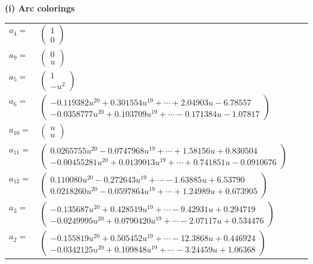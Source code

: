 \documentclass[1p]{elsarticle_modified}
\theoremstyle{definition}
\begin{document}
\flushleft \textbf{(i) Arc colorings}\\
\begin{tabular}{m{7pt} m{180pt} m{7pt} m{180pt} }
\flushright $a_{4}=$&$\begin{pmatrix}1\\0\end{pmatrix}$ \\
\flushright $a_{9}=$&$\begin{pmatrix}0\\u\end{pmatrix}$ \\
\flushright $a_{5}=$&$\begin{pmatrix}1\\- u^2\end{pmatrix}$ \\
\flushright $a_{6}=$&$\begin{pmatrix}-0.119382 u^{20}+0.301554 u^{19}+\cdots+2.04903 u-6.78557\\-0.0358777 u^{20}+0.103709 u^{19}+\cdots-0.171384 u-1.07817\end{pmatrix}$ \\
\flushright $a_{10}=$&$\begin{pmatrix}u\\u\end{pmatrix}$ \\
\flushright $a_{11}=$&$\begin{pmatrix}0.0265755 u^{20}-0.0747968 u^{19}+\cdots+1.58156 u+0.830504\\-0.00455281 u^{20}+0.0139013 u^{19}+\cdots+0.741851 u-0.0910676\end{pmatrix}$ \\
\flushright $a_{12}=$&$\begin{pmatrix}0.110080 u^{20}-0.272643 u^{19}+\cdots-1.63885 u+6.53790\\0.0218260 u^{20}-0.0597864 u^{19}+\cdots+1.24989 u+0.673905\end{pmatrix}$ \\
\flushright $a_{3}=$&$\begin{pmatrix}-0.135687 u^{20}+0.428519 u^{19}+\cdots-9.42931 u+0.294719\\-0.0249995 u^{20}+0.0790420 u^{19}+\cdots-2.07117 u+0.534476\end{pmatrix}$ \\
\flushright $a_{2}=$&$\begin{pmatrix}-0.155819 u^{20}+0.505452 u^{19}+\cdots-12.3868 u+0.446924\\-0.0342125 u^{20}+0.109848 u^{19}+\cdots-3.24459 u+1.06368\end{pmatrix}$ \\

\end{tabular}
\end{document}
